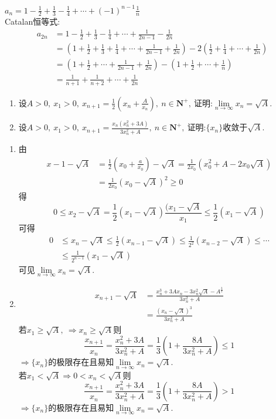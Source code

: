 $a_n=1-\frac{1}{2}+\frac{1}{3}-\frac{1}{4}+\cdots+(-1)^{n-1}\frac{1}{n}$\\
Catalan恒等式:
$$\begin{aligned}
	a_{2n}&=1-\frac{1}{2}+\frac{1}{3}-\frac{1}{4}+\cdots+\frac{1}{2n-1}-\frac{1}{2n}\\
	&=(1+\frac{1}{2}+\frac{1}{3}+\frac{1}{4}+\cdots+\frac{1}{2n-1}+\frac{1}{2n})-2(\frac{1}{2}+\frac{1}{4}+\cdots+\frac{1}{2n})\\
	&=(1+\frac{1}{2}+\cdots+\frac{1}{2n-1}+\frac{1}{2n})-(1+\frac{1}{2}+\cdots+\frac{1}{n})\\
	&=\frac{1}{n+1}+\frac{1}{n+2}+\cdots+\frac{1}{2n}
\end{aligned}$$
\newpage
\begin{problem}
	\begin{enumerate}
		\item 设$A>0,\ x_1>0,\ x_{n+1}=\frac{1}{2}\left(x_n+\frac{A}{x_n}\right),\ n\in\mathbf{N}^+,\ $证明:$\lim\limits_{n\rightarrow\infty}x_n=\sqrt{A}.$
		\item 设$A>0,\ x_1>0,\ x_{n+1}=\frac{x_n(x_n^2+3A)}{3x_n^2+A},\ n\in\mathbf{N}^+,\ $证明:$\{x_n\}$收敛于$\sqrt{A}.$
	\end{enumerate}
\end{problem}
\begin{solution}
	\begin{enumerate}
		\item 由
		$$\begin{aligned}
			x-1-\sqrt{A}&=\frac{1}{2}\left(x_0+\frac{a}{x_0}\right)-\sqrt{A}=\frac{1}{2x_0}(x_0^2+A-2x_0\sqrt{A})\\
			&=\frac{1}{2x_0}(x_0-\sqrt{A})^2\geqslant 0
		\end{aligned}$$
		得
		$$0\leqslant x_2-\sqrt{A}=\frac{1}{2}(x_1-\sqrt{A})\frac{(x_1-\sqrt{A}}{x_1}\leqslant\frac{1}{2}(x_1-\sqrt{A})$$
		可得
		$$\begin{aligned}
			0&\leqslant x_n-\sqrt{A}\leqslant\frac{1}{2}(x_{n-1}-\sqrt{A})\leqslant\frac{1}{2^2}(x_{n-2}-\sqrt{A})\leqslant\cdots\\
			&\leqslant\frac{1}{2^{n-1}}(x_1-\sqrt{A})
		\end{aligned}$$
		可见$\lim\limits_{n\rightarrow\infty}x_n=\sqrt{A}.$
		\item 
		$$\begin{aligned}
			x_{n+1}-\sqrt{A}&=\frac{x_n^3+3Ax_n-3x_n^2\sqrt{A}-A^{\frac{3}{2}}}{3x_n^2+A}\\
			&=\frac{(x_n-\sqrt{A})^3}{3x_n^2+A}
		\end{aligned}$$
		若$x_1\geqslant \sqrt{A},\ \Rightarrow x_n\geqslant\sqrt{A}$则
		$$\frac{x_{n+1}}{x_n}=\frac{x_n^2+3A}{3x_n^2+A}=\frac{1}{3}\left(1+\frac{8A}{3x_n^2+A}\right)\leqslant 1$$
		$\Rightarrow\{x_n\}$的极限存在且易知$\lim\limits_{n\rightarrow\infty}x_n=\sqrt{A}.$\\
		若$x_1<\sqrt{A}\Rightarrow 0<x_n<\sqrt{A}$则
		$$\frac{x_{n+1}}{x_n}=\frac{x_n^2+3A}{3x_n^2+A}=\frac{1}{3}\left(1+\frac{8A}{3x_n^2+A}\right)> 1$$
		$\Rightarrow\{x_n\}$的极限存在且易知$\lim\limits_{n\rightarrow\infty}x_n=\sqrt{A}.$
	\end{enumerate}
\end{solution}
